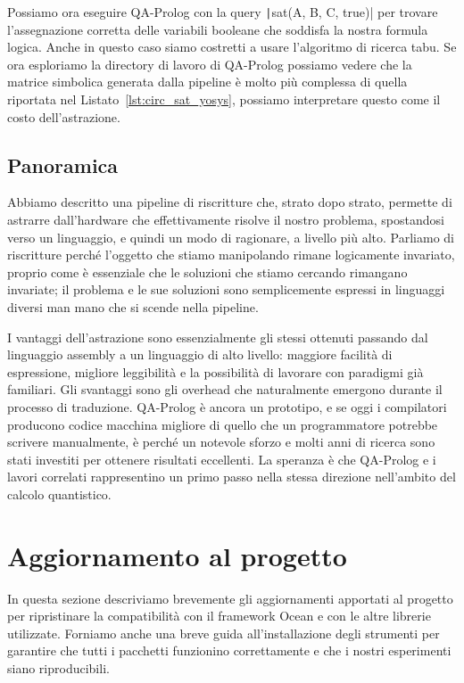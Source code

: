 Possiamo ora eseguire QA-Prolog con la query \texttt|sat(A, B, C, true)| per trovare l'assegnazione corretta delle variabili booleane che soddisfa la nostra formula logica. Anche in questo caso siamo costretti a usare l'algoritmo di ricerca tabu. Se ora esploriamo la directory di lavoro di QA-Prolog possiamo vedere che la matrice simbolica generata dalla pipeline è molto più complessa di quella riportata nel Listato~\ref{lst:circ_sat_yosys}, possiamo interpretare questo come il costo dell'astrazione.

\subsection{Panoramica}
Abbiamo descritto una pipeline di riscritture che, strato dopo strato, permette di astrarre dall'hardware che effettivamente risolve il nostro problema, spostandosi verso un linguaggio, e quindi un modo di ragionare, a livello più alto. Parliamo di riscritture perché l'oggetto che stiamo manipolando rimane logicamente invariato, proprio come è essenziale che le soluzioni che stiamo cercando rimangano invariate; il problema e le sue soluzioni sono semplicemente espressi in linguaggi diversi man mano che si scende nella pipeline.

I vantaggi dell'astrazione sono essenzialmente gli stessi ottenuti passando dal linguaggio assembly a un linguaggio di alto livello: maggiore facilità di espressione, migliore leggibilità e la possibilità di lavorare con paradigmi già familiari. Gli svantaggi sono gli overhead che naturalmente emergono durante il processo di traduzione. QA-Prolog è ancora un prototipo, e se oggi i compilatori producono codice macchina migliore di quello che un programmatore potrebbe scrivere manualmente, è perché un notevole sforzo e molti anni di ricerca sono stati investiti per ottenere risultati eccellenti. La speranza è che QA-Prolog e i lavori correlati rappresentino un primo passo nella stessa direzione nell'ambito del calcolo quantistico.

\section{Aggiornamento al progetto}
In questa sezione descriviamo brevemente gli aggiornamenti apportati al progetto per ripristinare la compatibilità con il framework Ocean e con le altre librerie utilizzate. Forniamo anche una breve guida all'installazione degli strumenti per garantire che tutti i pacchetti funzionino correttamente e che i nostri esperimenti siano riproducibili.
